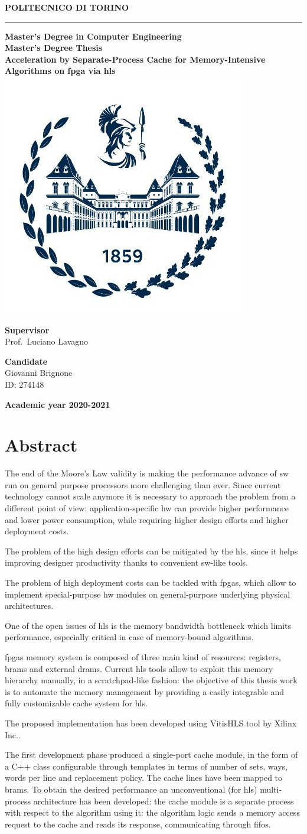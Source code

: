 \documentclass[11pt,a4paper,oneside]{memoir}
\renewcommand*{\maketitle}%
{
	\newgeometry{left=2cm,right=2cm,top=3cm,bottom=3.5cm}

	\begin{center}
		\begingroup
		{\Huge\textbf{POLITECNICO DI TORINO}}\\[\baselineskip]
		\rule{\textwidth}{2pt}\par
		\vspace*{1em}
		{\LARGE\textbf{Master's Degree in Computer Engineering}}\\[\baselineskip]
		\vspace*{1em}
		{\Large\textbf{Master's Degree Thesis}}\\
		\vspace*{2cm}
		{\huge\textbf{Acceleration by Separate-Process Cache for
		Memory-Intensive Algorithms on \acs{fpga} via \acl{hls}}}\\
		\vspace*{1cm}
		\includegraphics[width=.3\textwidth]{figures/polito-logo}
	\end{center}
	\vfill
	\begin{minipage}{0.4\textwidth}
		\begin{flushleft}
			{\Large
				\textbf{Supervisor}\\
				Prof.\ Luciano Lavagno
			}
		\end{flushleft}
	\end{minipage}
	\begin{minipage}{0.4\textwidth}
		\begin{flushright} 
			{\Large
				\textbf{Candidate}\\
				Giovanni Brignone\\
				ID: 274148
			}
		\end{flushright}
	\end{minipage}  
	\vspace*{2cm}
	\begin{center}
		{\Large\textbf{Academic year 2020-2021}}
	\end{center}
	\endgroup

	\restoregeometry 
}
\begin{document}
\pagestyle{empty}
\maketitle

\frontmatter
\chapter*{Abstract}
The end of the Moore's Law validity is making the performance advance of
\acl{sw} run on general purpose processors more challenging than ever.
Since current technology cannot scale anymore it is necessary to approach the
problem from a different point of view: application-specific \acl{hw} can
provide higher performance and lower power consumption, while requiring higher
design efforts and higher deployment costs.

The problem of the high design efforts can be mitigated by the \acf{hls}, since
it helps improving designer productivity thanks to convenient \acl{sw}-like
tools.

The problem of high deployment costs can be tackled with \acp{fpga}, which allow
to implement special-purpose \acl{hw} modules on general-purpose underlying
physical architectures.

\bigskip
One of the open issues of \ac{hls} is the memory bandwidth bottleneck which
limits performance, especially critical in case of memory-bound algorithms.

\acp{fpga} memory system is composed of three main kind of resources: registers,
\acp{bram} and external \acp{dram}.
Current \ac{hls} tools allow to exploit this memory hierarchy manually, in a
scratchpad-like fashion: the objective of this thesis work is to automate the
memory management by providing a easily integrable and fully customizable cache
system for \ac{hls}.

\bigskip
The proposed implementation has been developed using Vitis\texttrademark HLS
tool by Xilinx Inc..

The first development phase produced a single-port cache module, in the form of
a C++ class configurable through templates in terms of number of sets, ways,
words per line and replacement policy.
The cache lines have been mapped to \acp{bram}.
To obtain the desired performance an unconventional (for \ac{hls}) multi-process
architecture has been developed: the cache module is a separate process with
respect to the algorithm using it: the algorithm logic sends a memory access
request to the cache and reads its response, communicating through \acsp{fifo}.
\end{document}
